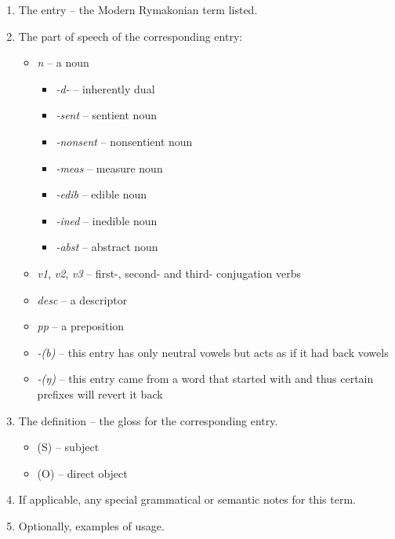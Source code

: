 \documentclass{book}
\newcommand{\lname}{Modern Rymakonian}
\begin{document}
\begin{enumerate}
    \item The entry -- the \lname{} term listed.
    \item The part of speech of the corresponding entry:
    \begin{itemize}
        \item \textit{n} -- a noun
        \begin{itemize}
          \item \textit{-d-} -- inherently dual
          \item \textit{-sent} -- sentient noun
          \item \textit{-nonsent} -- nonsentient noun
          \item \textit{-meas} -- measure noun
          \item \textit{-edib} -- edible noun
          \item \textit{-ined} -- inedible noun
          \item \textit{-abst} -- abstract noun
        \end{itemize}
        \item \textit{v1}, \textit{v2}, \textit{v3} -- first-, second- and third- conjugation verbs
        \item \textit{desc} -- a descriptor
        \item \textit{pp} -- a preposition
        \item \textit{-(b)} -- this entry has only neutral vowels but acts as if it had back vowels
        \item \textit{-(ŋ)} -- this entry came from a word that started with  and thus certain prefixes will revert it back
    \end{itemize}
    \item The definition -- the gloss for the corresponding entry.
    \begin{itemize}
        \item (S) -- subject
        \item (O) -- direct object
    \end{itemize}
    \item If applicable, any special grammatical or semantic notes for this term.
    \item Optionally, examples of usage.
\end{enumerate}

\begin{multicols}{2}
    
\end{multicols}
\end{document}
